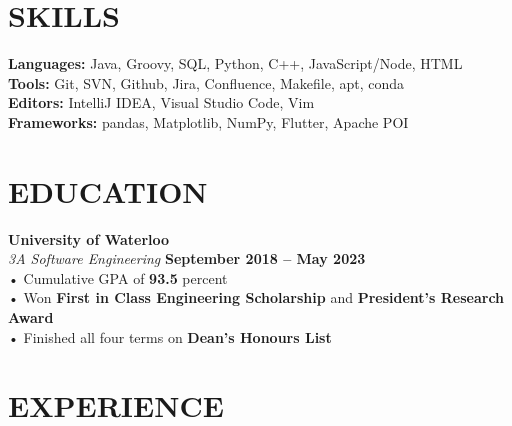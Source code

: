 \documentclass[margin,line]{resume}
\begin{document}
\begin{resume}
    \section{\mysidestyle \textbf{\large{S}\small{KILLS}}}

    \textbf{Languages:} Java, Groovy, SQL, Python, C++, JavaScript/Node, HTML\\
    \textbf{Tools:} Git, SVN, Github, Jira, Confluence, Makefile, apt, conda \\
    \textbf{Editors:} IntelliJ IDEA, Visual Studio Code, Vim \\
    \textbf{Frameworks:} pandas, Matplotlib, NumPy, Flutter, Apache POI
    \vspace{-1mm}

\sectionline

    \section{\mysidestyle \textbf{\large{E}\small{DUCATION}}}

    \textbf{\listing University of Waterloo} \vspace{2mm}\\\vspace{1mm}%
    \textsl{3A Software Engineering} \hfill \textbf{September 2018 -- May 2023}\\
    • Cumulative GPA of \textbf{93.5} percent\\
    • Won \textbf{First in Class Engineering Scholarship} and 
    \textbf{President’s Research Award}\\
    • Finished all four terms on \textbf{Dean's Honours List}
    \vspace{-1mm}
\sectionline

    \section{\mysidestyle \textbf{\large{E}\small{XPERIENCE}}}


\end{resume}
\end{document}

